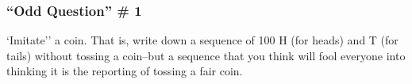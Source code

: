 \documentclass[handout]{beamer}
\begin{document}
%
%
\begin{frame}
\frametitle{``Odd Question''  \# 1 }
\normalsize
`Imitate'' a coin. That is, write down a sequence of 100 H (for heads) and T (for tails) without tossing a coin--but a sequence that you think will fool everyone into thinking it is the reporting of tossing a fair coin.
		
\end{frame}
\end{document}
